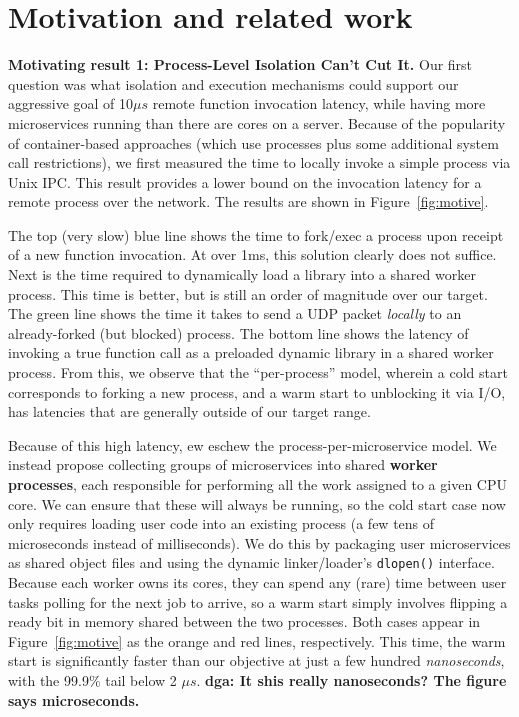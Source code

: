 \section{Motivation and related work}
\label{sec:motive}

\textbf{Motivating result 1:  Process-Level Isolation Can't Cut It.}
Our first question was what isolation and execution mechanisms could support
our aggressive goal of 10$\mu{}s$ remote function invocation latency, while
having more microservices running than there are cores on a server.
Because of the popularity of container-based approaches (which use processes
plus some additional system call restrictions), we first measured the time
to locally invoke a simple process via Unix IPC.  This result provides
a lower bound on the invocation latency for a remote process over the network.
The results are shown in Figure~\ref{fig:motive}.

The top (very slow) blue line shows the time to fork/exec a process upon receipt
of a new function invocation.  At over 1ms, this solution clearly does not
suffice.  Next is the time required to dynamically load a library into a shared
worker process.  This time is better, but is still an order of magnitude over
our target.  The green line shows the time it takes to send a UDP packet
\emph{locally} to an already-forked (but blocked) process.  The bottom
line shows the latency of invoking a true function call as a preloaded dynamic
library in a shared worker process.  From this, we observe that the
``per-process'' model, wherein a cold start corresponds to forking a new
process, and a warm start to unblocking it via I/O, has latencies that are
generally outside of our target range.

Because of this high latency, ew eschew the process-per-microservice model.
We instead propose
collecting groups of microservices into shared \textbf{worker processes},
each responsible for performing all the work assigned to a given CPU core.  We can
ensure that these will always be running, so the cold start case now only requires
loading user code into an existing process (a few tens of microseconds instead
of milliseconds).  We do this by packaging user
microservices as shared object files and using the dynamic linker/loader's
\texttt{dlopen()} interface.  Because each worker owns its cores, they can spend any
(rare) time between user tasks polling for the next job to arrive, so a warm start
simply involves flipping a ready bit in memory shared between the two processes.
Both cases appear in Figure~\ref{fig:motive} as the orange and red lines,
respectively.  This time, the warm start is significantly faster than our objective
at just a few hundred \textit{nanoseconds}, with the 99.9\% tail below 2
$\mu{}s$.
\textbf{dga:  It shis really nanoseconds?  The figure says microseconds.}


